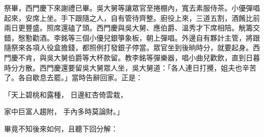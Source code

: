 \begin{showcontents}{}
祭畢，西門慶下來謝禮已畢。吳大舅等讓眾官至捲棚內，寬去素服侍茶。小優彈唱起來，安席上坐。手下跟隨之人，自有管待齊整。廚役上來，三道五割，酒餚比前兩日更豐盛。照席還磕了頭。西門慶與吳大舅、應伯爵、溫秀才下席相陪。觥籌交錯，慇懃勸酒。李銘等三個小優兒銀箏象板，朝上彈唱。外邊自有夥計主管，將跟隨祭來各項人役盒擔錢，都照例打發銀子停當。眾官坐到後晌時分，就要起身。西門慶不肯，與吳大舅伯爵等大杯款留。教李銘等彈樂器，唱小曲兒歡飲，直到日暮時分方散。西門慶還要留吳大舅眾人坐，吳大舅道：「各人連日打攪，姐夫也辛苦了。各自歇息去罷。」當時告辭回家。正是：

「天上碧桃和露種，  日邊紅杏倚雲栽，

家中巨富人趨附，  手內多時莫論財。」

畢竟不知後來如何，且聽下回分解：




\end{showcontents}


